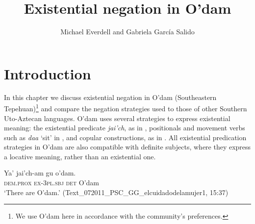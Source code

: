 \documentclass[output=paper,draft,draftmode,colorlinks,citecolor=brown]{langscibook}
\author{Michael Everdell\affiliation{University of Texas at Austin} and
Gabriela García Salido
\affiliation{CEA-FCPyS-Universidad Nacional Autónoma de México}}
\title{Existential negation in O'dam}
\begin{document}
\maketitle

\newcommand{\ɇ}{\stacktwo{/}{e}}
\section{Introduction} 
In this chapter we discuss existential negation in O’dam (Southeastern Tepehuan)\footnote{We use O’dam here in accordance with the community’s preferences.} and compare the negation strategies used to those of other Southern Uto-Aztecan languages. 
O’dam uses several strategies to express existential meaning: the existential predicate \emph{jai'ch}, as in , positionals and movement verbs such as \emph{daa} `sit' in , and copular constructions, as in . All existential predication strategies in O'dam are also compatible with definite subjects, where they express a locative meaning, rather than an existential one.

\begin{exe}
\ex\label{ex:odam-introtep}
\gll Ya’ jai’ch-am gu o’dam.\\
\textsc{dem.prox} \textsc{ex-3pl.sbj} \textsc{det} O'dam\\
\glt ‘There are O'dam.’ (Text\_072011\_PSC\_GG\_elcuidadodelamujer1, 15:37)
\end{exe}
\end{document}
